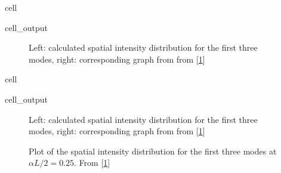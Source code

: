 \documentclass[a4paper,10pt,english,openany,oneside]{jupyterBook}
\begin{document}
\begin{sphinxuseclass}{cell}\begin{sphinxVerbatimOutput}

\begin{sphinxuseclass}{cell_output}
\begin{figure}[htbp]
\centering
\capstart

\noindent{}
\caption{Left: calculated spatial intensity distribution for the first three modes, right: corresponding graph from from {[}\hyperlink{cite.bib:id3}{1}{]}}\label{\detokenize{Kogelnik-Shank_Coupled-Wave-Theory_DFB-Lasers:kogelnik11cc}}\end{figure}

\end{sphinxuseclass}\end{sphinxVerbatimOutput}

\end{sphinxuseclass}
\begin{sphinxuseclass}{cell}\begin{sphinxVerbatimOutput}

\begin{sphinxuseclass}{cell_output}
\begin{figure}[htbp]
\centering
\capstart

\noindent{}
\caption{Left: calculated spatial intensity distribution for the first three modes, right: corresponding graph from from {[}\hyperlink{cite.bib:id3}{1}{]}}\label{\detokenize{Kogelnik-Shank_Coupled-Wave-Theory_DFB-Lasers:kogelnik11dc}}\end{figure}

\end{sphinxuseclass}\end{sphinxVerbatimOutput}

\end{sphinxuseclass}
\begin{figure}[htbp]
\centering
\capstart

\noindent{}
\caption{Plot of the spatial intensity distribution for the first three modes at \(\alpha L / 2 =0.25\). From {[}\hyperlink{cite.bib:id3}{1}{]}}\label{\detokenize{Kogelnik-Shank_Coupled-Wave-Theory_DFB-Lasers:kogelnik12a}}\end{figure}
\end{document}
